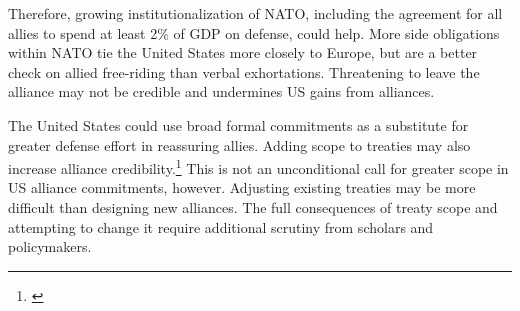 \documentclass[12pt]{article}
\begin{document}
 
Therefore, growing institutionalization of NATO, including the agreement for all allies to spend at least 2\% of GDP on defense, could help.
More side obligations within NATO tie the United States more closely to Europe, but are a better check on allied free-riding than verbal exhortations. 
Threatening to leave the alliance may not be credible and undermines US gains from alliances. 


The United States could use broad formal commitments as a substitute for greater defense effort in reassuring allies.
Adding scope to treaties may also increase alliance credibility.\footnote{\cite{Poast2013}}
This is not an unconditional call for greater scope in US alliance commitments, however. 
Adjusting existing treaties may be more difficult than designing new alliances. 
The full consequences of treaty scope and attempting to change it require additional scrutiny from scholars and policymakers. 

 



\singlespace
 
 
\end{document}
